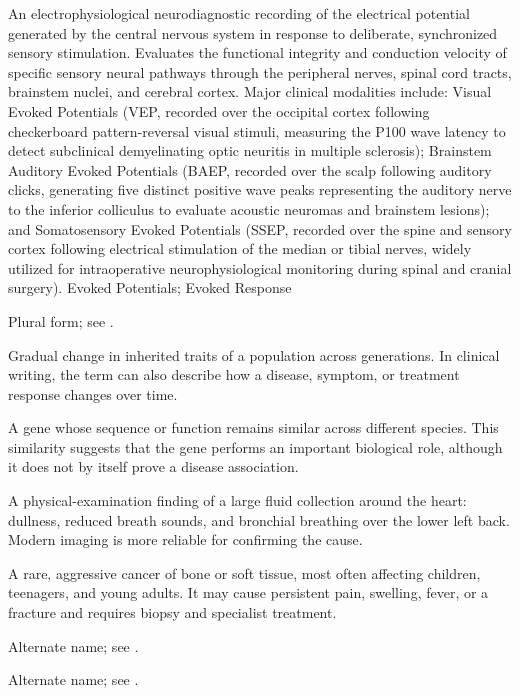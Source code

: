  An electrophysiological neurodiagnostic recording of the electrical potential generated by the central nervous system in response to deliberate, synchronized sensory stimulation. Evaluates the functional integrity and conduction velocity of specific sensory neural pathways through the peripheral nerves, spinal cord tracts, brainstem nuclei, and cerebral cortex. Major clinical modalities include: Visual Evoked Potentials (VEP, recorded over the occipital cortex following checkerboard pattern-reversal visual stimuli, measuring the P100 wave latency to detect subclinical demyelinating optic neuritis in multiple sclerosis); Brainstem Auditory Evoked Potentials (BAEP, recorded over the scalp following auditory clicks, generating five distinct positive wave peaks representing the auditory nerve to the inferior colliculus to evaluate acoustic neuromas and brainstem lesions); and Somatosensory Evoked Potentials (SSEP, recorded over the spine and sensory cortex following electrical stimulation of the median or tibial nerves, widely utilized for intraoperative neurophysiological monitoring during spinal and cranial surgery).
\synonyms
Evoked Potentials; Evoked Response

 Plural form; see .

 Gradual change in inherited traits of a population across generations. In clinical writing, the term can also describe how a disease, symptom, or treatment response changes over time.

 A gene whose sequence or function remains similar across different species. This similarity suggests that the gene performs an important biological role, although it does not by itself prove a disease association.

 A physical-examination finding of a large fluid collection around the heart: dullness, reduced breath sounds, and bronchial breathing over the lower left back. Modern imaging is more reliable for confirming the cause.

 A rare, aggressive cancer of bone or soft tissue, most often affecting children, teenagers, and young adults. It may cause persistent pain, swelling, fever, or a fracture and requires biopsy and specialist treatment.

 Alternate name; see .

 Alternate name; see .

